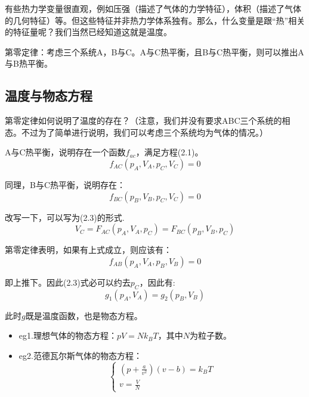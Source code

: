 \documentclass[a4paper, 10pt, openany]{book}%
\begin{document}
有些热力学变量很直观，例如压强（描述了气体的力学特征），体积（描述了气体的几何特征）等。但这些特征并非热力学体系独有。那么，什么变量是跟“热”相关的特征量呢？我们当然已经知道这就是温度。

\vspace{10pt}

{第零定律：考虑三个系统A，B与C。A与C热平衡，且B与C热平衡，则可以推出A与B热平衡。}

\vspace{10pt}

\subsection{温度与物态方程}

第零定律如何说明了温度的存在？（注意，我们并没有要求ABC三个系统的相态。不过为了简单进行说明，我们可以考虑三个系统均为气体的情况。）


A与C热平衡，说明存在一个函数$f_{ac}$，满足方程(2.1)。
\begin{equation}
f_{AC}(p_A,V_A,p_C,V_C)=0
\end{equation}

同理，B与C热平衡，说明存在：
\begin{equation}
f_{BC}(p_B,V_B,p_C,V_C)=0
\end{equation}

改写一下，可以写为(2.3)的形式.
\begin{equation}
V_C=F_{AC}(p_A,V_A,p_C)=F_{BC}(p_B,V_B,p_C)
\end{equation}

第零定律表明，如果有上式成立，则应该有：
\begin{equation}
  f_{AB}(p_A,V_A,p_B,V_B)=0
  \end{equation}

即上推下。因此(2.3)式必可以约去$p_C$，因此有:
\begin{equation}
  g_1(p_A,V_A)=g_2(p_B,V_B)
  \end{equation}

  此时$g$既是温度函数，也是物态方程。
\begin{itemize}

\item eg1.理想气体的物态方程：$pV=Nk_BT$，其中$N$为粒子数。

\item eg2.范德瓦尔斯气体的物态方程：
\begin{equation}\begin{cases}(p+\frac{a}{v^2})(v-b)=k_BT \\ v=\frac{V}{N}\end{cases}\end{equation}

\end{itemize}
\end{document}
